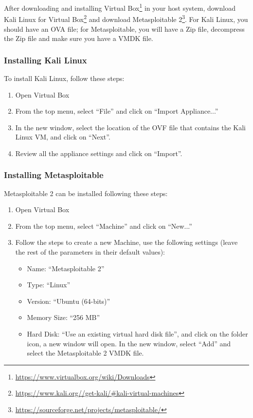 After downloading and installing Virtual Box\footnote{\url{https://www.virtualbox.org/wiki/Downloads}} in your host system, download Kali Linux for Virtual Box\footnote{\url{https://www.kali.org//get-kali/\#kali-virtual-machines}} and download Metasploitable 2\footnote{\url{https://sourceforge.net/projects/metasploitable/}}. For Kali Linux, you should have an OVA file; for Metasploitable, you will have a Zip file, decompress the Zip file and make sure you have a VMDK file.

\subsubsection*{Installing Kali Linux}

To install Kali Linux, follow these steps:

\begin{enumerate}
    \item Open Virtual Box
    \item From the top menu, select ``File'' and click on ``Import Appliance...''
    \item In the new window, select the location of the OVF file that contains the Kali Linux VM, and click on ``Next''.
    \item Review all the appliance settings and click on ``Import''.
\end{enumerate}

\subsubsection*{Installing Metasploitable}

Metasploitable 2 can be installed following these steps:

\begin{enumerate}
    \item Open Virtual Box
    \item From the top menu, select ``Machine'' and click on ``New...''
    \item Follow the steps to create a new Machine, use the following settings (leave the rest of the parameters in their default values): 
    \begin{itemize}
        \item Name: ``Metasploitable 2''
        \item Type: ``Linux''
        \item Version: ``Ubuntu (64-bits)''
        \item Memory Size: ``256 MB''
        \item Hard Disk: ``Use an existing virtual hard disk file'', and click on the folder icon, a new window will open. In the new window, select ``Add'' and select the Metasploitable 2 VMDK file. 
    \end{itemize} 
\end{enumerate}

